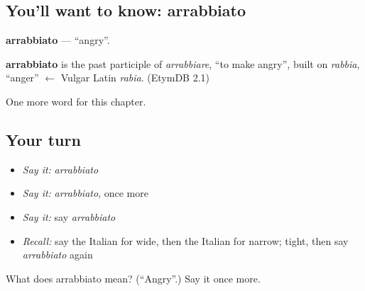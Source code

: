 \subsection*{You'll want to know: arrabbiato}
\textbf{arrabbiato} — \textquotedblleft{}angry\textquotedblright{}.

\begin{cousinweb}
\textbf{arrabbiato} is the past participle of \emph{arrabbiare}, \textquotedblleft{}to make angry\textquotedblright{}, built on \emph{rabbia}, \textquotedblleft{}anger\textquotedblright{} $\leftarrow$ Vulgar Latin \emph{rabia}. (EtymDB 2.1)
\end{cousinweb}

\begin{grammarlens}[title={What you've built}]
One more word for this chapter.
\end{grammarlens}

\subsection*{Your turn}
\begin{itemize}
\raggedright
  \item \emph{Say it:} \emph{arrabbiato}
  \item \emph{Say it:} \emph{arrabbiato}, once more
  \item \emph{Say it:} say \emph{arrabbiato}
  \item \emph{Recall:} say the Italian for wide, then the Italian for narrow; tight, then say \emph{arrabbiato} again
\end{itemize}

\begin{tcolorbox}[breakable,colback=teal!4,colframe=teal!35!black,title={Before you move on}]
What does arrabbiato mean? (\textquotedblleft{}Angry\textquotedblright{}.) Say it once more.
\end{tcolorbox}

